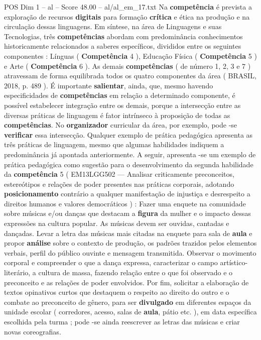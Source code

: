 \begin{textsample}{POS Dim 1 – al – Score 48.00 – al/al\_em\_17.txt}
Na \textbf{competência} é prevista a exploração de recursos \textbf{digitais} para formação \textbf{crítica} e ética na produção e na circulação dessas linguagens.
Em síntese, na área de Linguagens e suas Tecnologias, três \textbf{competências} abordam com predominância conhecimentos historicamente relacionados a saberes específicos, divididos entre os seguintes componentes : Línguas ( \textbf{Competência} 4 ), Educação Física ( \textbf{Competência} 5 ) e Arte ( \textbf{Competência} 6 ).
As demais \textbf{competências} ( de número 1, 2, 3 e 7 ) atravessam de forma equilibrada todos os quatro componentes da área ( BRASIL, 2018, p. 489 ).
É importante \textbf{salientar}, ainda, que, mesmo havendo especificidades de \textbf{competências} em relação a determinado componente, é possível estabelecer integração entre os demais, porque a intersecção entre as diversas práticas de linguagem é fator intrínseco à proposição de todas as \textbf{competências}.
No \textbf{organizador} curricular da área, por exemplo, pode -se \textbf{verificar} essa intersecção.
Qualquer exemplo de prática pedagógica apresenta as três práticas de linguagem, mesmo que algumas habilidades indiquem a predominância já apontada anteriormente.
A seguir, apresenta -se um exemplo de prática pedagógica como sugestão para o desenvolvimento da segunda habilidade da \textbf{competência} 5 ( EM13LGG502 — Analisar criticamente preconceitos, estereótipos e relações de poder presentes nas práticas corporais, adotando \textbf{posicionamento} contrário a qualquer manifestação de injustiça e desrespeito a direitos humanos e valores democráticos ) : Fazer uma enquete na comunidade sobre músicas e/ou danças que destacam a \textbf{figura} da mulher e o impacto dessas expressões na cultura popular.
As músicas devem ser ouvidas, cantadas e dançadas.
Levar a letra das músicas mais citadas na enquete para sala de \textbf{aula} e propor \textbf{análise} sobre o contexto de produção, os padrões trazidos pelos elementos verbais, perfil do público ouvinte e mensagem transmitida.
Observar o movimento corporal e compreender o que a dança expressa, caracterizar o campo artístico-literário, a cultura de massa, fazendo relação entre o que foi observado e o preconceito e as relações de poder envolvidos.
Por fim, solicitar a elaboração de textos opinativos curtos que destaquem o respeito ao direito do outro e o combate ao preconceito de gênero, para ser \textbf{divulgado} em diferentes espaços da unidade escolar ( corredores, acesso, salas de \textbf{aula}, pátio etc. ), em data específica escolhida pela turma ; pode -se ainda reescrever as letras das músicas e criar novas coreografias.

\end{textsample}
